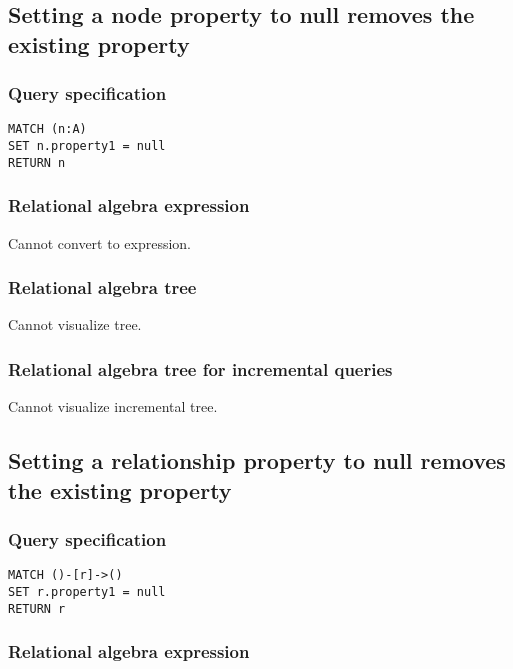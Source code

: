 \subsection{Setting a node property to null removes the existing property}

\subsubsection*{Query specification}

\begin{lstlisting}
MATCH (n:A)
SET n.property1 = null
RETURN n
\end{lstlisting}

\subsubsection*{Relational algebra expression}

Cannot convert to expression.

\subsubsection*{Relational algebra tree}

Cannot visualize tree.

\subsubsection*{Relational algebra tree for incremental queries}

Cannot visualize incremental tree.

\subsection{Setting a relationship property to null removes the existing property}

\subsubsection*{Query specification}

\begin{lstlisting}
MATCH ()-[r]->()
SET r.property1 = null
RETURN r
\end{lstlisting}

\subsubsection*{Relational algebra expression}

